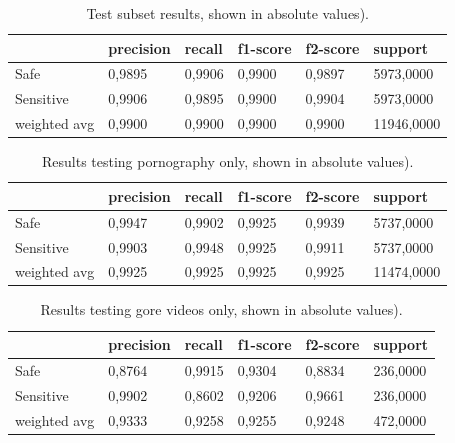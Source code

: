 \begin{table}[]
\centering
\label{tab:test-general}
\caption{Test subset results, shown in absolute values).}
\begin{tabular}{l|l|l|l|l|l}
             & precision & recall & f1-score & f2-score & support                         \\ \hline
Safe         & 0,9895    & 0,9906 & 0,9900   & 0,9897   & 5973,0000                       \\ \hline
Sensitive    & 0,9906    & 0,9895 & 0,9900   & 0,9904   & 5973,0000                       \\ \hline
weighted avg & 0,9900    & 0,9900 & 0,9900   & 0,9900   & \multicolumn{1}{l}{11946,0000}
\end{tabular}
\end{table}

\begin{table}[]
\centering
\label{tab:test-porn}
\caption{Results testing pornography only, shown in absolute values).}
\begin{tabular}{l|l|l|l|l|l}
             & precision & recall & f1-score & f2-score & support    \\ \hline
Safe         & 0,9947    & 0,9902 & 0,9925   & 0,9939   & 5737,0000  \\ \hline
Sensitive    & 0,9903    & 0,9948 & 0,9925   & 0,9911   & 5737,0000  \\ \hline
weighted avg & 0,9925    & 0,9925 & 0,9925   & 0,9925   & 11474,0000
\end{tabular}
\end{table}

\begin{table}[]
\centering
\label{tab:test-gore}
\caption{Results testing gore videos only, shown in absolute values).}
\begin{tabular}{l|l|l|l|l|l}
             & precision & recall & f1-score & f2-score & support  \\ \hline
Safe         & 0,8764    & 0,9915 & 0,9304   & 0,8834   & 236,0000 \\ \hline
Sensitive    & 0,9902    & 0,8602 & 0,9206   & 0,9661   & 236,0000 \\ \hline
weighted avg & 0,9333    & 0,9258 & 0,9255   & 0,9248   & 472,0000
\end{tabular}
\end{table}


